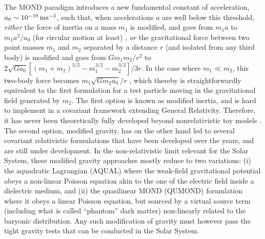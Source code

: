 \documentclass[reprint,nofootinbib,prd,aps]{revtex4-2}
\begin{document}
The MOND paradigm introduces a new fundamental constant of acceleration, $a_0 \sim 10^{-10} \, {\rm m}{\rm s}^{-2}$, such that, when accelerations $a$ are well below this threshold, \emph{either} the force of inertia on a mass $m_1$ is modified, and goes from $m_1 a$ to $m_1 a^2/a_0$ (for circular motion at least) \cite{inertia}, \emph{or} the gravitational force between two point masses $m_1$ and $m_2$ separated by a distance $r$ (and isolated from any third body) is modified and goes from $G m_1 m_2/r^2$ to $2\sqrt{Ga_0}\left[ (m_1+m_2)^{3/2} - m_1^{3/2} - m_2^{3/2} \right]/3r $. In the case where $m_1 \ll m_2$, this two-body force becomes $m_1 \sqrt{Gm_2a_0}/r$ \citep[see, e.g.,][]{FamaeyDura}, which thereby is straightforwardly equivalent to the first formulation for a test particle moving in the gravitational field generated by $m_2$. The first option is known as modified inertia, and is hard to implement in a covariant framework extending General Relativity. Therefore, it has never been theoretically fully developed beyond nonrelativistic toy models \citep{inertia}. The second option, modified gravity, has on the other hand led to several covariant relativistic formulations \citep[][]{Skordis,BIMOND,Blanchet,Deffayet} that have been developed over the years, and are still under development. In the non-relativistic limit relevant for the Solar System, these modified gravity approaches mostly \citep[but see, e.g.,][for details]{FamaeyDura} reduce to two variations: (i) the aquadratic Lagrangian (AQUAL) where the weak-field gravitational potential obeys a non-linear Poisson equation akin to the one of the electric field inside a dielectric medium, and (ii) the quasilinear MOND (QUMOND) formulation where it obeys a linear Poisson equation, but sourced by a virtual source term (including what is called ``phantom'' dark matter) non-linearly related to the baryonic distribution. Any such modification of gravity must however pass the tight gravity tests that can be conducted in the Solar System. 
\end{document}
